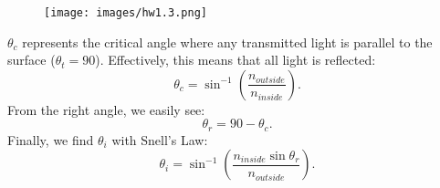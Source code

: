 \documentclass{article}
\begin{document}
\begin{figure}[htp]
    \centering
    \texttt{[image: images/hw1.3.png]}
\end{figure}

$\theta _{c}$ represents the critical angle where any transmitted light is parallel to the surface ($\theta _{t} =90$). Effectively, this means that all light is reflected:
\begin{equation*}
\theta _{c} =\sin^{-1}\left(\frac{n_{outside}}{n_{inside}}\right) .
\end{equation*}
From the right angle, we easily see:
\begin{equation*}
\theta _{r} =90-\theta _{c} .
\end{equation*}
Finally, we find $\theta _{i}$ with Snell's Law:
\begin{equation*}
\theta _{i} =\sin^{-1}\left(\frac{n_{inside}\sin \theta _{r}}{n_{outside}}\right) .
\end{equation*}








\end{document}
